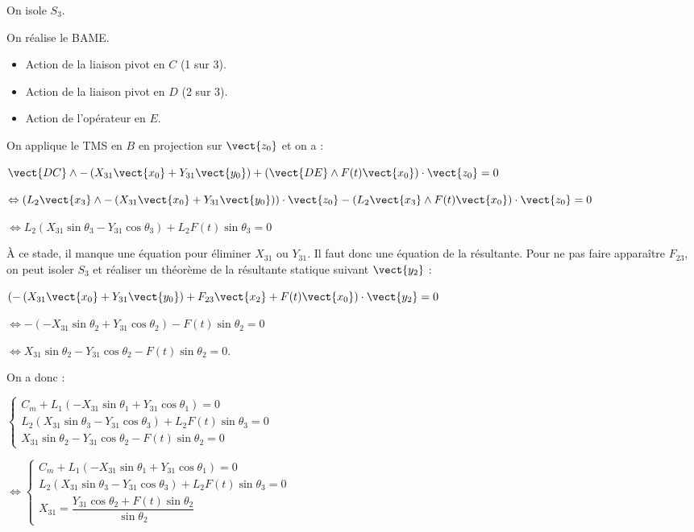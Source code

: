 \begin{multicols}{2}
\begin{corrige}
\vspace{.5cm} 

On isole $S_3$.

On réalise le BAME.
\begin{itemize}
\item Action de la liaison pivot en $C$ (1 sur 3). 
\item Action de la liaison pivot en $D$ (2 sur 3). 
\item Action de l'opérateur en $E$.
\end{itemize}

On applique le TMS en $B$ en projection sur $\vect{z_0}$ et on a : 

$\vect{DC}\wedge-\left(X_{31}\vect{x_0}+Y_{31}\vect{y_0} \right) +\left(\vect{DE}\wedge F(t)\vect{x_0} \right)\cdot\vect{z_0}=0$

$\Leftrightarrow\left( L_2\vect{x_3}\wedge-\left(X_{31}\vect{x_0}+Y_{31}\vect{y_0} \right) \right) \cdot\vect{z_0}-\left(L_2\vect{x_3}\wedge F(t)\vect{x_0}\right)\cdot\vect{z_0}=0$

$\Leftrightarrow L_2\left(X_{31} \sin \theta_3-Y_{31}\cos \theta_3 \right)  +L_2 F(t)\sin\theta_3=0$

À ce stade, il manque une équation pour éliminer $X_{31}$ ou $Y_{31}$. Il faut donc une équation de la résultante. Pour ne pas faire apparaître $F_{23}$, on peut isoler $S_3$ et réaliser un théorème de la résultante statique suivant $\vect{y_2}$ :

$\left(-\left(X_{31}\vect{x_0}+Y_{31}\vect{y_0} \right) +F_{23}\vect{x_2}+F(t)\vect{x_0}\right) \cdot \vect{y_2}=0$

$\Leftrightarrow -\left(- X_{31}\sin \theta_2+Y_{31}\cos\theta_2 \right)- F(t)\sin \theta_2=0$

$\Leftrightarrow  X_{31}\sin \theta_2-Y_{31}\cos\theta_2- F(t)\sin \theta_2=0$.

On a donc : 

$\left\{\begin{array}{l}
 C_m + L_1\left(-X_{31}\sin \theta_1+Y_{31} \cos \theta_1 \right) =0 \\
 L_2\left(X_{31} \sin \theta_3-Y_{31}\cos \theta_3 \right)  +L_2 F(t)\sin\theta_3=0 \\
 X_{31}\sin \theta_2-Y_{31}\cos\theta_2- F(t)\sin \theta_2=0
\end{array}
\right.
$

$\Leftrightarrow \left\{\begin{array}{l}
 C_m + L_1\left(-X_{31}\sin \theta_1+Y_{31} \cos \theta_1 \right) =0 \\
 L_2\left(X_{31} \sin \theta_3-Y_{31}\cos \theta_3 \right)  +L_2 F(t)\sin\theta_3=0 \\
 X_{31} = \dfrac{Y_{31}\cos\theta_2+ F(t)\sin \theta_2}{\sin \theta_2}
\end{array}
\right.
$


\end{corrige}
\end{multicols}
